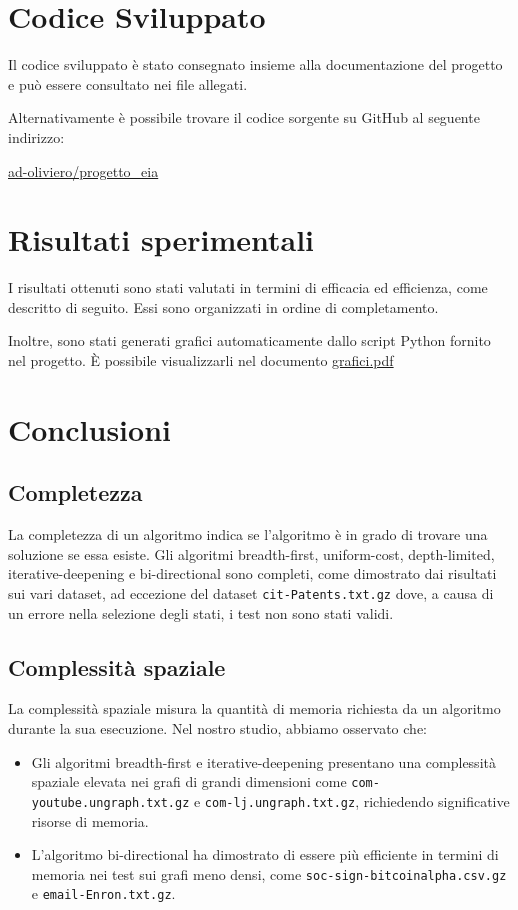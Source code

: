 \documentclass{article}
\begin{document}
\section{Codice Sviluppato}
Il codice sviluppato è stato consegnato insieme alla documentazione del progetto e può essere consultato nei file allegati.

Alternativamente è possibile trovare il codice sorgente su GitHub al seguente indirizzo:

\href{https://github.com/ad-oliviero/progetto_eia}{ad-oliviero/progetto\_eia}


\section{Risultati sperimentali}
I risultati ottenuti sono stati valutati in termini di efficacia ed efficienza, come descritto di seguito.
Essi sono organizzati in ordine di completamento.

Inoltre, sono stati generati grafici automaticamente dallo script Python fornito nel progetto.
È possibile visualizzarli nel documento \href{run:grafici.pdf}{grafici.pdf}




\section{Conclusioni}
\subsection{Completezza}
La completezza di un algoritmo indica se l'algoritmo è in grado di trovare una soluzione se essa esiste. Gli algoritmi breadth-first, uniform-cost, depth-limited, iterative-deepening e bi-directional sono completi, come dimostrato dai risultati sui vari dataset, ad eccezione del dataset \texttt{cit-Patents.txt.gz} dove, a causa di un errore nella selezione degli stati, i test non sono stati validi.

\subsection{Complessità spaziale}
La complessità spaziale misura la quantità di memoria richiesta da un algoritmo durante la sua esecuzione. Nel nostro studio, abbiamo osservato che:
\begin{itemize}
	\item Gli algoritmi breadth-first e iterative-deepening presentano una complessità spaziale elevata nei grafi di grandi dimensioni come \texttt{com-youtube.ungraph.txt.gz} e \texttt{com-lj.ungraph.txt.gz}, richiedendo significative risorse di memoria.
	\item L'algoritmo bi-directional ha dimostrato di essere più efficiente in termini di memoria nei test sui grafi meno densi, come \texttt{soc-sign-bitcoinalpha.csv.gz} e \texttt{email-Enron.txt.gz}.
\end{itemize}
\end{document}
